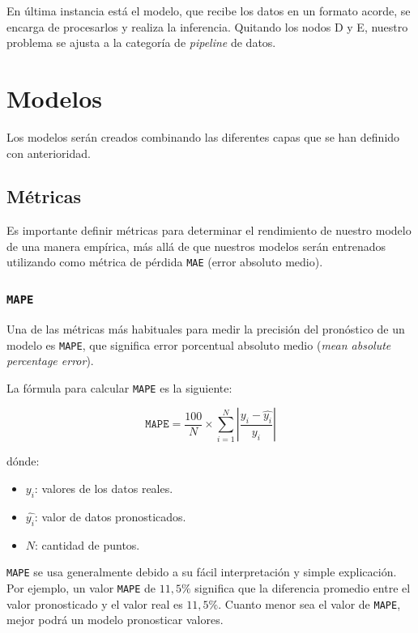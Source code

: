 \documentclass[a4paper,12pt]{article}
\begin{document}
		En última instancia está el modelo, que recibe los datos en un formato acorde, se encarga de procesarlos y realiza la inferencia. Quitando los nodos D y E, nuestro problema se ajusta a la categoría de \textit{pipeline} de datos.
						
		\clearpage
						
		\section{Modelos}\label{TrainingModel}
						
		Los modelos serán creados combinando las diferentes capas que se han definido con anterioridad.
						
		\subsection{Métricas}
						
		Es importante definir métricas para determinar el rendimiento de nuestro modelo de una manera empírica, más allá de que nuestros modelos serán entrenados utilizando como métrica de pérdida \texttt{MAE} (error absoluto medio).
						
		\subsubsection{\texttt{MAPE}}
						
		Una de las métricas más habituales para medir la precisión del pronóstico de un modelo es \texttt{MAPE}, que significa error porcentual absoluto medio (\textit{mean absolute percentage error}). \citep{MAPE}
						
		La fórmula para calcular \texttt{MAPE} es la siguiente:
						
		$$ \texttt{MAPE} = \frac{100}{N} \times \sum_{i=1}^{N} |\frac{y_i - \hat{y_i}}{y_i}| $$
						
		dónde:
						
		\begin{itemize}[noitemsep, topsep=2pt]
			\item $ y_i$: valores de los datos reales.
			\item $ \hat{y_i}$: valor de datos pronosticados.
			\item $ N $: cantidad de puntos.
		\end{itemize}
						
		\texttt{MAPE} se usa generalmente debido a su fácil interpretación y simple explicación. Por ejemplo, un valor \texttt{MAPE} de $11,5\%$ significa que la diferencia promedio entre el valor pronosticado y el valor real es $11,5\%$. Cuanto menor sea el valor de \texttt{MAPE}, mejor podrá un modelo pronosticar valores.
						
\end{document}
